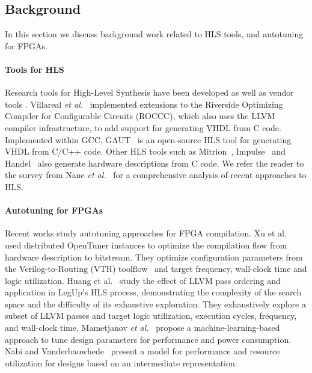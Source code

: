 \subsection{Background}
\label{sec:FPGAbackground}

In this section we discuss background work related to HLS tools,
and autotuning for FPGAs.

\paragraph{Tools for HLS}

Research tools for High-Level Synthesis have been developed as well as vendor
tools \cite{singh2011implementing, feist2012vivado}. Villareal \emph{et
al.}~\cite{villarreal2010designing} implemented extensions to the Riverside
Optimizing Compiler for Configurable Circuits (ROCCC), which also uses the LLVM
compiler infrastructure, to add support for generating VHDL from C code.
Implemented within GCC, GAUT~\cite{coussy2010gaut} is an open-source HLS tool
for generating VHDL from C/C++ code. Other HLS tools such as
Mitrion~\cite{kindratenko2007mitrion}, Impulse~\cite{antola2007novel} and
Handel~\cite{loo2002handel} also generate hardware descriptions from C code.
We refer the reader to the survey from Nane \emph{et al.}~\cite{nane2016survey}
for a comprehensive analysis of recent approaches to HLS.

\paragraph{Autotuning for FPGAs}

Recent works study autotuning approaches for FPGA compilation.  Xu et
al.~\cite{xu2017parallel} used distributed OpenTuner instances to optimize the
compilation flow from hardware description to bitstream.  They optimize
configuration parameters from the Verilog-to-Routing (VTR)
toolflow~\cite{luu2014vtr} and target frequency, wall-clock time and logic
utilization.  Huang et al.~\cite{huang2015effect} study the effect of LLVM pass
ordering and application in LegUp's HLS process, demonstrating the complexity
of the search space and the difficulty of its exhaustive exploration.  They
exhaustively explore a subset of LLVM passes and target logic utilization,
execution cycles, frequency, and wall-clock time.  Mametjanov \emph{et
al.}~\cite{mametjanov2015autotuning} propose a machine-learning-based approach
to tune design parameters for performance and power consumption.  Nabi and
Vanderbauwhede~\cite{nabi2016fast} present a model for performance and resource
utilization for designs based on an intermediate representation.

